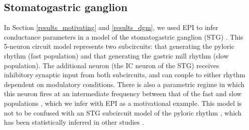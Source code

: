 \documentclass[11pt]{article}
\DeclareMathOperator*{\argmin}{argmin}
\begin{document}

\subsection{Stomatogastric ganglion}\label{methods_STG}
In Section \ref{results_motivating} and \ref{results_dgm}, we used EPI to infer conductance parameters in a model of the stomatogastric ganglion (STG) \cite{gutierrez2013multiple}.
This 5-neuron circuit model represents two subcircuits: that generating the pyloric rhythm (fast population) and that generating the gastric mill rhythm (slow population).
The additional neuron (the IC neuron of the STG) receives inhibitory synaptic input from both subcircuits, and can couple to either rhythm dependent on  modulatory conditions.
There is also a parametric regime in which this neuron fires at an intermediate frequency between that of the fast and slow populations \cite{gutierrez2013multiple}, which we infer with EPI as a motivational example.
This model is not to be confused with an STG subcircuit model of the pyloric rhythm \cite{marder1992dynamic}, which has been statistically inferred in other studies \cite{prinz2004similar, gonccalves2019training}.
\end{document}
